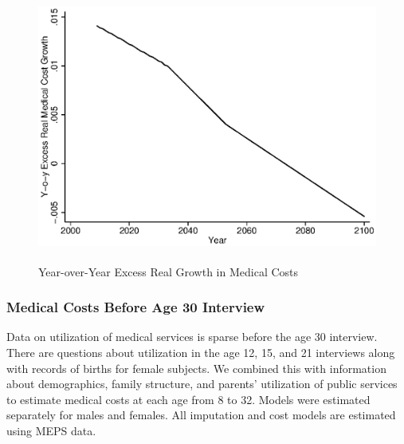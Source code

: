 \begin{figure}
\caption{Year-over-Year Excess Real Growth in Medical Costs} \label{figure:medgrowth_yearly}
 \centering
	 \includegraphics[height=3.5in]{AppOutput/Health/medgrowth_yearly}
\end{figure}

\subsubsection{Medical Costs Before Age 30 Interview}
\label{appendix:health-costs-before-age30}

\noindent Data on utilization of medical services is sparse before the age 30 interview. There are questions about utilization in the age 12, 15, and 21 interviews along with records of births for female subjects. We combined this with information about demographics, family structure, and parents' utilization of public services to estimate medical costs at each age from 8 to 32. Models were estimated separately for males and females. All imputation and cost models are estimated using MEPS data.


